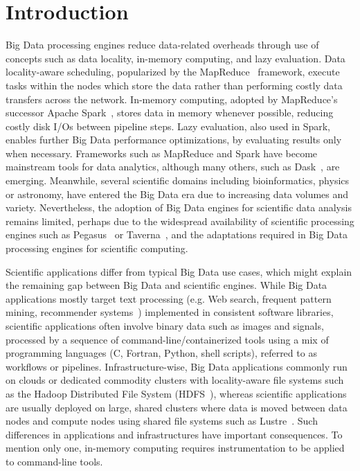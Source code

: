 \documentclass{IEEEtran}
\begin{document}
\section{Introduction} %

Big Data processing engines reduce data-related overheads through 
use of concepts such as data locality, in-memory computing, and lazy evaluation.
Data locality-aware scheduling, popularized by the MapReduce~\cite{dean2008mapreduce} 
framework, execute tasks within the nodes which store the data rather than 
performing costly data transfers across the network. In-memory 
computing, adopted by MapReduce's successor Apache 
Spark~\cite{zaharia2016apache}, stores data in memory whenever 
possible, reducing costly disk I/Os between pipeline steps. 
Lazy evaluation, also used in Spark, enables further Big Data performance 
optimizations, by evaluating results only when necessary. Frameworks 
such as
MapReduce and Spark have become mainstream tools for data analytics, 
although many others, such as 
Dask~\cite{rocklin2015dask}, are emerging. 
Meanwhile, several scientific 
domains including bioinformatics, physics or astronomy, have entered 
the Big Data era due to increasing data volumes and variety. 
Nevertheless, the adoption of Big Data engines for scientific data analysis 
remains limited, perhaps due to the widespread availability of 
scientific processing engines such as Pegasus~\cite{deelman2005pegasus} or
Taverna~\cite{oinn2004taverna}, and the adaptations required in Big 
Data processing engines for scientific computing. 

Scientific applications differ from typical Big Data use 
cases, which might explain the remaining gap between Big Data and 
scientific engines. While Big Data applications mostly target text 
processing (e.g. Web search, frequent pattern mining, recommender 
systems~\cite{leskovec2014mining}) implemented in consistent software 
libraries, scientific applications often involve 
binary data such as images and signals, processed by a sequence of 
command-line/containerized tools
using a mix of programming languages (C, Fortran, Python, shell 
scripts), referred to as workflows or pipelines. Infrastructure-wise, 
Big Data applications commonly run on 
clouds or dedicated commodity clusters with locality-aware file systems 
such as the Hadoop Distributed File System 
(HDFS~\cite{shvachko2010hadoop}), whereas scientific applications are 
usually deployed on large, shared clusters where data is moved between
data nodes and compute nodes using shared file systems such 
as Lustre~\cite{schwan2003lustre}. Such differences in applications and 
infrastructures have important consequences. To 
mention only one, in-memory computing requires instrumentation to be 
applied to command-line tools. 
\end{document}
